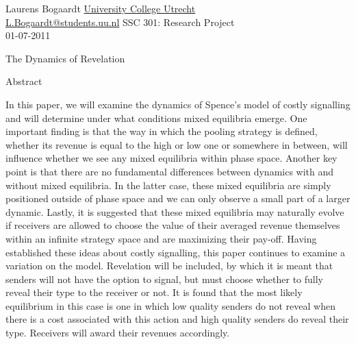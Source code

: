 \documentclass[a4paper,10pt]{article}
\numberwithin{equation}{section}
\begin{document}
\label{sec:Cover Page}

Laurens Bogaardt \hfill \href{http://www.uu.nl/ucu}{University College Utrecht}\\
\href{mailto:L.Bogaardt@students.uu.nl}{L.Bogaardt@students.uu.nl} \hfill SSC 301: Research Project\\
01-07-2011\\

\vspace{4cm}

\begin{center}
\begin{LARGE}
\begin{bf}
The Dynamics of Revelation
\end{bf}
\end{LARGE}
\end{center}

\vfill

\begin{center}
\begin{minipage}[t]{0.7\textwidth}
\begin{bf}
Abstract
\end{bf}
\newline
\newline
In this paper, we will examine the dynamics of Spence's model of costly signalling and will determine under what conditions mixed equilibria emerge. One important finding is that the way in which the pooling strategy is defined, whether its revenue is equal to the high or low one or somewhere in between, will influence whether we see any mixed equilibria within phase space. Another key point is that there are no fundamental differences between dynamics with and without mixed equilibria. In the latter case, these mixed equilibria are simply positioned outside of phase space and we can only observe a small part of a larger dynamic. Lastly, it is suggested that these mixed equilibria may naturally evolve if receivers are allowed to choose the value of their averaged revenue themselves within an infinite strategy space and are maximizing their pay-off. Having established these ideas about costly signalling, this paper continues to examine a variation on the model. Revelation will be included, by which it is meant that senders will not have the option to signal, but must choose whether to fully reveal their type to the receiver or not. It is found that the most likely equilibrium in this case is one in which low quality senders do not reveal when there is a cost associated with this action and high quality senders do reveal their type. Receivers will award their revenues accordingly.
\end{minipage}
\end{center}
\end{document}
